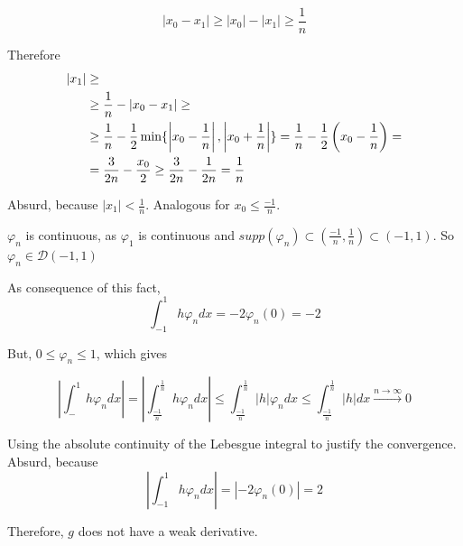 \documentclass{article}
\begin{document}
    \[
        |x_0 - x_1| \ge |x_0| - |x_1|  \ge \frac{1}{n}
    \]

    Therefore
    \begin{align}
        |x_1| &\ge \notag \\ 
        &\ge\frac{1}{n} - |x_0 - x_1| \ge \notag \\
        & \ge \frac{1}{n} - \frac{1}{2} \min\{ \left|x_0 - \frac{1}{n}\right| , \left| x_0 + \frac 1n \right| \} = \frac{1}{n} - \frac{1}{2}\left(x_0 - \frac{1}{n}\right) = \notag \\
        &= \frac{3}{2n} - \frac{x_0}{2} \ge \frac{3}{2n} - \frac{1}{2n} = \frac{1}{n} \notag
    \end{align}

    Absurd, because $|x_1| < \frac{1}{n}$. Analogous for  $x_0 \le \frac{-1}{n}$.

    $\varphi_n$ is continuous, as $\varphi_1$ is continuous and $supp(\varphi_n) \subset \left(\frac{-1}{n}, \frac{1}{n}\right) \subset (-1,1)$. So  $\varphi_n \in \mathcal{D}(-1,1)$

    As consequence of this fact, 
    \[
        \int_{-1}^{1}h \varphi_n dx = -2 \varphi_n(0) = -2
    \]
    
    But, $0 \le \varphi_n \le 1$, which gives

    \[
        \left|\int_{-}^{1}h \varphi_n dx\right| = \left| \int_{\frac{-1}{n}}^{\frac{1}{n}} h \varphi_n dx \right| \le \int_{\frac{-1}{n}}^{\frac{1}{n}} |h| \varphi_n dx \le \int_{\frac{-1}{n}}^{\frac{1}{n}} |h| dx \overset{n \to \infty}{\longrightarrow} 0
    \]

    Using the absolute continuity of the Lebesgue integral to justify the convergence. Absurd, because
    \[
       \left| \int_{-1}^{1}h \varphi_n dx \right| = |-2 \varphi_n(0)| = 2
    \]

    Therefore, $g$ does not have a weak derivative.
\end{document}
